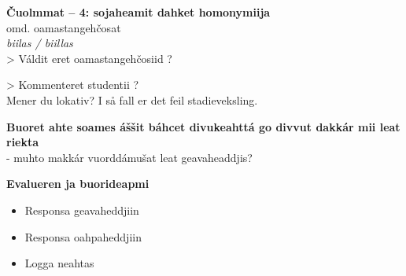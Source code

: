 \documentclass[landscape,norsk,11pt]{seminar}
\begin{document}
\begin{slide}
\newslide
\textbf{Čuolmmat -- 4: sojaheamit dahket homonymiija} \\
omd. oamastangehčosat \\
\textit{biilas / biillas} \\
> Váldit eret oamastangehčosiid ?

> Kommenteret studentii ?\\
Mener du lokativ? I så fall er det feil stadieveksling.








\newslide
\textbf{Buoret ahte soames áššit báhcet divukeahttá go divvut dakkár mii leat riekta} \\
- muhto makkár vuorddámušat leat geavaheaddjis?

\newslide
\textbf{Evalueren ja buorideapmi}
\begin{itemize}
\item{Responsa geavaheddjiin}
\item{Responsa oahpaheddjiin}
\item{Logga neahtas}
\end{itemize}


\end{slide}
\end{document}
